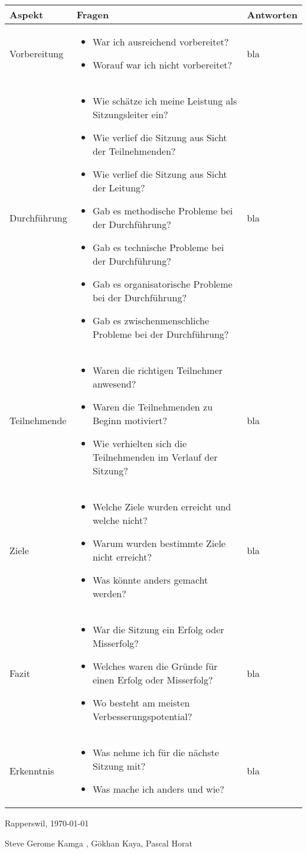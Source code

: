 \documentclass[10pt]{article}
\begin{document}
\begin{tabular}{|p{2.2cm}|p{10cm}|p{5cm}|}
\hline
\textbf{Aspekt} & \textbf{Fragen} & \textbf{Antworten} \\ \hline
Vorbereitung & \begin{itemize} \item War ich ausreichend vorbereitet? \item Worauf war ich nicht vorbereitet? \end{itemize} & bla \\ \hline
Durchführung & \begin{itemize} \item Wie schätze ich meine Leistung als Sitzungsleiter ein? \item Wie verlief die Sitzung aus Sicht der Teilnehmenden? \item Wie verlief die Sitzung aus Sicht der Leitung? \item Gab es methodische Probleme bei der Durchführung? \item Gab es technische Probleme bei der Durchführung? \item Gab es organisatorische Probleme bei der Durchführung? \item Gab es zwischenmenschliche Probleme bei der Durchführung?\end{itemize} & bla \\ \hline
Teilnehmende & \begin{itemize} \item Waren die richtigen Teilnehmer anwesend? \item Waren die Teilnehmenden zu Beginn motiviert? \item Wie verhielten sich die Teilnehmenden im Verlauf der Sitzung? \end{itemize} & bla\\ \hline
Ziele & \begin{itemize} \item Welche Ziele wurden erreicht und welche nicht? \item Warum wurden bestimmte Ziele nicht erreicht? \item Was könnte anders gemacht werden?\end{itemize} & bla \\ \hline
Fazit & \begin{itemize} \item War die Sitzung ein Erfolg oder Misserfolg? \item Welches waren die Gründe für einen Erfolg oder Misserfolg? \item Wo besteht am meisten Verbesserungspotential?\end{itemize} & bla \\ \hline
Erkenntnis & \begin{itemize} \item Was nehme ich für die nächste Sitzung mit? \item Was mache ich anders und wie? \end{itemize} & bla \\ \hline

\end{tabular}

\vspace{1cm}

Rapperswil, \today

\vspace{1cm}

Steve Gerome Kamga , Gökhan Kaya, Pascal Horat
\end{document}
